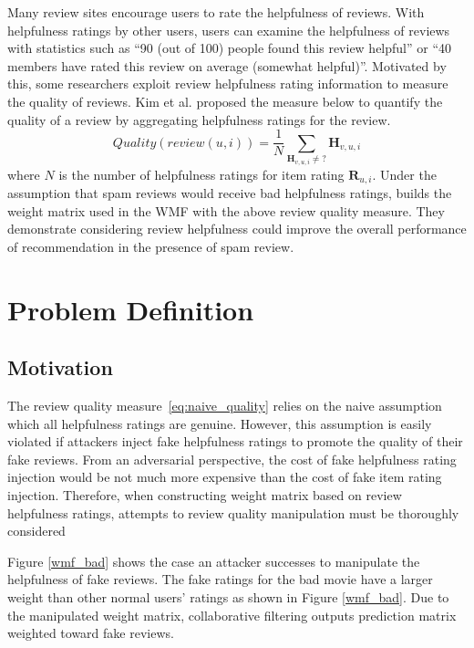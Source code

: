\documentclass[master,english,final]{kaist-ucs}
\begin{document}
Many review sites encourage users to rate the helpfulness of reviews.
With helpfulness ratings by other users, users can examine the helpfulness of reviews with statistics such as “90 (out of 100) people found this review helpful” or “40 members have rated this review on average (somewhat helpful)”.
Motivated by this, some researchers \cite{naive_helpfulness,RQMF} exploit review helpfulness rating information to measure the quality of reviews.
Kim et al. \cite{naive_helpfulness} proposed the measure below to quantify the quality of a review by aggregating helpfulness ratings for the review.
\begin{equation} \label{eq:naive_quality}
Quality(review(u,i))=\frac{1} {N} \sum_{\bm{H}_{v,u,i} \neq ?} \bm{H}_{v,u,i}
\end{equation}
where $N$ is the number of helpfulness ratings for item rating $\bm{R}_{u,i}$.
Under the assumption that spam reviews would receive bad helpfulness ratings, \cite{RQMF} builds the weight matrix used in the WMF with the above review quality measure.
They demonstrate considering review helpfulness could improve the overall performance of recommendation in the presence of spam review.

\chapter{Problem Definition}
\section{Motivation}
The review quality measure~\ref{eq:naive_quality} relies on the naive assumption which all helpfulness ratings are genuine.
However, this assumption is easily violated if attackers inject fake helpfulness ratings to promote the quality of their fake reviews.
From an adversarial perspective, the cost of fake helpfulness rating injection would be not much more expensive than the cost of fake item rating injection.
Therefore, when constructing weight matrix based on review helpfulness ratings, attempts to review quality manipulation must be thoroughly considered

Figure \ref{wmf_bad} shows the case an attacker successes to manipulate the helpfulness of fake reviews.
The fake ratings for the bad movie have a larger weight than other normal users' ratings as shown in Figure \ref{wmf_bad}.
Due to the manipulated weight matrix, collaborative filtering outputs prediction matrix weighted toward fake reviews.
\end{document}

